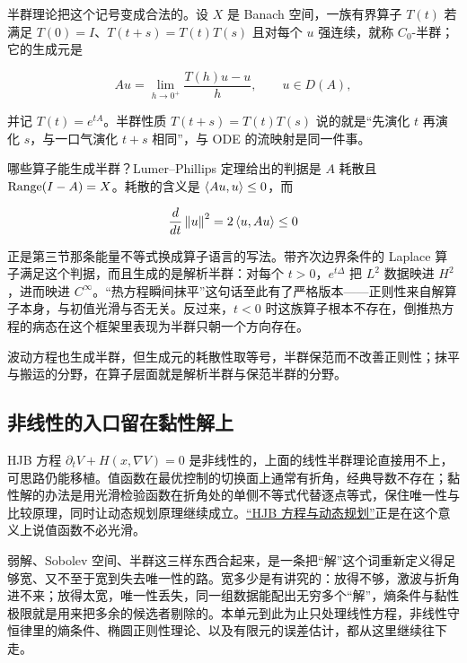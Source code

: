 半群理论把这个记号变成合法的。设 \(X\) 是 Banach 空间，一族有界算子 \(T(t)\) 若满足 \(T(0)=I\)、\(T(t+s)=T(t)T(s)\) 且对每个 \(u\) 强连续，就称 \(C_0\)-半群；它的生成元是

\[
Au=\lim_{h\to0^+}\frac{T(h)u-u}{h},
\qquad u\in D(A),
\]

并记 \(T(t)=e^{tA}\)。半群性质 \(T(t+s)=T(t)T(s)\) 说的就是``先演化 \(t\) 再演化 \(s\)，与一口气演化 \(t+s\) 相同''，与 ODE 的流映射是同一件事。

哪些算子能生成半群？Lumer--Phillips 定理给出的判据是 \(A\) 耗散且 \(\operatorname{Range}(I-A)=X\)。耗散的含义是 \(\left\langle Au,u\right\rangle\le0\)，而

\[
\frac{d}{dt}\left\lVert u\right\rVert^2=2\left\langle u,Au\right\rangle\le0
\]

正是第三节那条能量不等式换成算子语言的写法。带齐次边界条件的 Laplace 算子满足这个判据，而且生成的是解析半群：对每个 \(t>0\)，\(e^{t\Delta}\) 把 \(L^2\) 数据映进 \(H^2\)，进而映进 \(C^\infty\)。``热方程瞬间抹平''这句话至此有了严格版本——正则性来自解算子本身，与初值光滑与否无关。反过来，\(t<0\) 时这族算子根本不存在，倒推热方程的病态在这个框架里表现为半群只朝一个方向存在。

波动方程也生成半群，但生成元的耗散性取等号，半群保范而不改善正则性；抹平与搬运的分野，在算子层面就是解析半群与保范半群的分野。

\subsection{非线性的入口留在黏性解上}

HJB 方程 \(\partial_tV+H(x,\nabla V)=0\) 是非线性的，上面的线性半群理论直接用不上，可思路仍能移植。值函数在最优控制的切换面上通常有折角，经典导数不存在；黏性解的办法是用光滑检验函数在折角处的单侧不等式代替逐点等式，保住唯一性与比较原理，同时让动态规划原理继续成立。\hyperref[sec:16-Control-and-Reinforcement-Learning/01-Optimal-Control/03]{``HJB 方程与动态规划''}正是在这个意义上说值函数不必光滑。

弱解、Sobolev 空间、半群这三样东西合起来，是一条把``解''这个词重新定义得足够宽、又不至于宽到失去唯一性的路。宽多少是有讲究的：放得不够，激波与折角进不来；放得太宽，唯一性丢失，同一组数据能配出无穷多个``解''，熵条件与黏性极限就是用来把多余的候选者剔除的。本单元到此为止只处理线性方程，非线性守恒律里的熵条件、椭圆正则性理论、以及有限元的误差估计，都从这里继续往下走。
